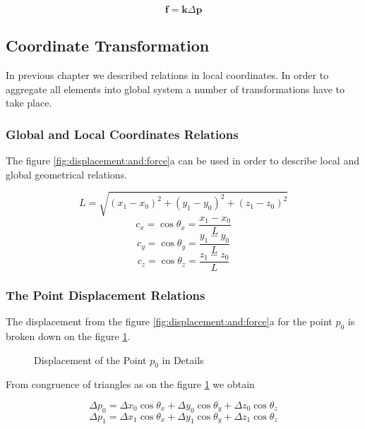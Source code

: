 \begin{equation}
\mathbf{f} = \mathbf{k} \Delta \mathbf{p}
\end{equation}

\subsection{Coordinate Transformation}

In previous chapter we described relations in local coordinates. In order to aggregate all elements into global system a number of transformations have to take place.

\subsubsection{Global and Local Coordinates Relations}

The figure \ref{fig:displacement:and:force}a can be used in order to describe local and global geometrical relations.

\begin{equation}
L = \sqrt { (x_1 - x_0)^2 + (y_1 - y_0)^2 + (z_1 - z_0)^2 }
\end{equation}
\begin{equation}
c_x = \cos \theta_x = \frac {x_1 - x_0} L
\end{equation}
\begin{equation}
c_y = \cos \theta_y = \frac {y_1 - y_0} L
\end{equation}
\begin{equation}
c_z = \cos \theta_z = \frac {z_1 - z_0} L
\end{equation}

\subsubsection{The Point Displacement Relations}

The displacement from the figure \ref{fig:displacement:and:force}a for the point $p_0$ is broken down on the figure \ref{fig:displacement:details}.

\begin{figure}[H]
\centering

\caption{Displacement of the Point $p_0$ in Details}
\label{fig:displacement:details}
\end{figure}

From congruence of triangles as on the figure \ref{fig:displacement:details} we obtain

\begin{equation}
\Delta p_0 = \Delta x_0 \cos \theta_x + \Delta y_0 \cos \theta_y + \Delta z_0 \cos \theta_z
\end{equation}
\begin{equation}
\Delta p_1 = \Delta x_1 \cos \theta_x + \Delta y_1 \cos \theta_y + \Delta z_1 \cos \theta_z
\end{equation}

